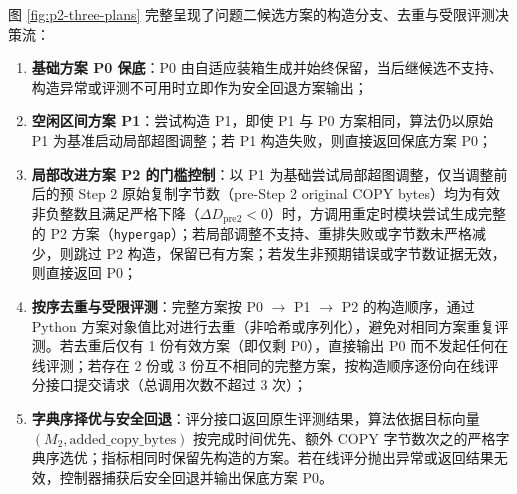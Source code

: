 \documentclass[anonymous,withtoc]{gmcm2026}
\providecommand{\tightlist}{\setlength{\itemsep}{0pt}\setlength{\parskip}{0pt}}
\begin{document}
图 \ref{fig:p2-three-plans} 完整呈现了问题二候选方案的构造分支、去重与受限评测决策流：

\begin{enumerate}
\def\labelenumi{\arabic{enumi}.}
\tightlist
\item
  \textbf{基础方案 P0 保底}：P0 由自适应装箱生成并始终保留，当后继候选不支持、构造异常或评测不可用时立即作为安全回退方案输出；
\item
  \textbf{空闲区间方案 P1}：尝试构造 P1，即使 P1 与 P0 方案相同，算法仍以原始 P1 为基准启动局部超图调整；若 P1 构造失败，则直接返回保底方案 P0；
\item
  \textbf{局部改进方案 P2 的门槛控制}：以 P1 为基础尝试局部超图调整，仅当调整前后的预 Step 2 原始复制字节数（pre-Step 2 original COPY bytes）均为有效非负整数且满足严格下降（\(\Delta D_{\mathrm{pre2}} < 0\)）时，方调用重定时模块尝试生成完整的 P2 方案（\texttt{hypergap}）；若局部调整不支持、重排失败或字节数未严格减少，则跳过 P2 构造，保留已有方案；若发生非预期错误或字节数证据无效，则直接返回 P0；
\item
  \textbf{按序去重与受限评测}：完整方案按 P0 \(\to\) P1 \(\to\) P2 的构造顺序，通过 Python 方案对象值比对进行去重（非哈希或序列化），避免对相同方案重复评测。若去重后仅有 1 份有效方案（即仅剩 P0），直接输出 P0 而不发起任何在线评测；若存在 2 份或 3 份互不相同的完整方案，按构造顺序逐份向在线评分接口提交请求（总调用次数不超过 3 次）；
\item
  \textbf{字典序择优与安全回退}：评分接口返回原生评测结果，算法依据目标向量 \((M_2,\allowbreak \text{added\_copy\_bytes})\) 按完成时间优先、额外 COPY 字节数次之的严格字典序选优；指标相同时保留先构造的方案。若在线评分抛出异常或返回结果无效，控制器捕获后安全回退并输出保底方案 P0。
\end{enumerate}
\end{document}
